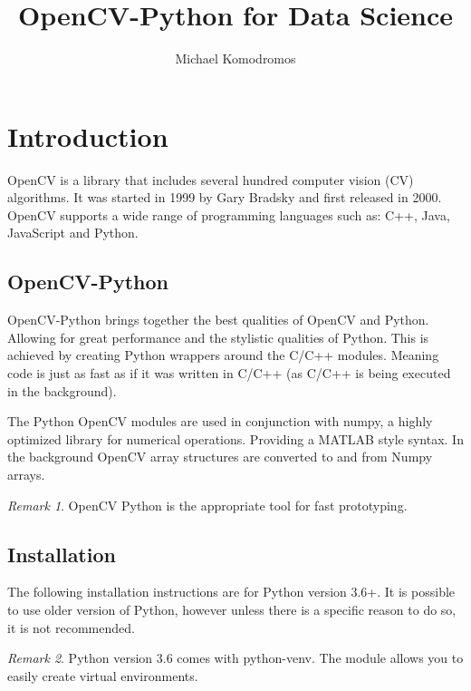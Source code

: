 \documentclass{article}
\theoremstyle{definition}
\theoremstyle{remark}
\newtheorem*{rem}{Remark}
\begin{document}
\title{ OpenCV-Python for Data Science  }
\author{Michael Komodromos}
\date{ }
\maketitle

\setcounter{tocdepth}{2}
\tableofcontents
\newpage

\section{Introduction}

OpenCV is a library that includes several hundred computer vision (CV) algorithms. It was started in 1999 by Gary Bradsky and first released in 2000. OpenCV supports a wide range of programming languages such as: C++, Java, JavaScript and Python.

\subsection{OpenCV-Python}

OpenCV-Python brings together the best qualities of OpenCV and Python. Allowing for great performance and the stylistic qualities of Python. This is achieved by creating Python wrappers around the C/C++ modules. Meaning code is just as fast as if it was written in C/C++ (as C/C++ is being executed in the background).

The Python OpenCV modules are used in conjunction with numpy, a highly optimized library for numerical operations. Providing a MATLAB style syntax. In the background OpenCV array structures are converted to and from Numpy arrays.

\begin{rem}
OpenCV Python is the appropriate tool for fast prototyping.
\end{rem}

\subsection{Installation}

The following installation instructions are for Python version 3.6+. It is possible to use older version of Python, however unless there is a specific reason to do so, it is not recommended. 

\begin{rem}
Python version 3.6 comes with python-venv. The module allows you to easily create virtual environments.
\end{rem}
\end{document}
